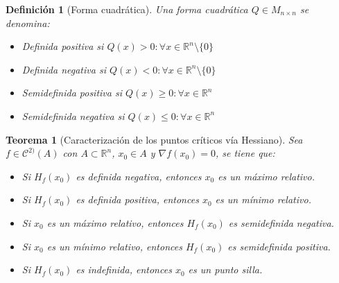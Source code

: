 \documentclass[10pt,a4paper,openright]{book}
\theoremstyle{break}
\newtheorem*{defi}{Definición}
\newtheorem*{theo}{Teorema}
\begin{document}
\begin{defi}[Forma cuadrática]
Una forma cuadrática $Q \in M_{n \times n}$ se denomina:
\begin{itemize}
\item Definida positiva si $Q(x) > 0 : \forall x \in \mathbb{R}^n \setminus \{0\}$
\item Definida negativa si $Q(x) < 0 : \forall x \in \mathbb{R}^n \setminus \{0\}$
\item Semidefinida positiva si $Q(x) \geq 0 : \forall x \in \mathbb{R}^n$
\item Semidefinida negativa si $Q(x) \leq 0 : \forall x \in \mathbb{R}^n$
\end{itemize}
\end{defi}

\begin{theo}[Caracterización de los puntos críticos vía Hessiano]
Sea $f \in \mathcal{C}^{2)} (A)$ con $A \subset \mathbb{R}^n$, $x_0 \in A$ y $\nabla f(x_0) = 0$, se tiene que:
\begin{itemize}
\item Si $H_f (x_0)$ es definida negativa, entonces $x_0$ es un máximo relativo.
\item  Si $H_f (x_0)$ es definida positiva, entonces $x_0$ es un mínimo relativo.
\item  Si $x_0$ es un máximo relativo, entonces $H_f (x_0)$ es semidefinida negativa.
\item   Si $x_0$ es un mínimo relativo, entonces $H_f (x_0)$ es semidefinida positiva.
\item  Si $H_f (x_0)$ es indefinida, entonces $x_0$ es un punto silla.
\end{itemize}
\end{theo}
\end{document}
